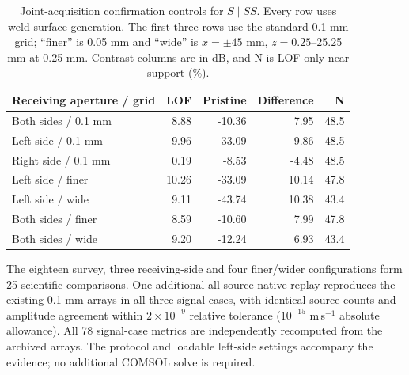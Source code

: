 \begin{table}[htbp]\centering\small
\caption{Joint-acquisition confirmation controls for $S\mid SS$. Every row uses weld-surface generation. The first three rows use the standard 0.1 mm grid; ``finer'' is 0.05 mm and ``wide'' is $x=\pm45$ mm, $z=0.25$--25.25 mm at 0.25 mm. Contrast columns are in dB, and N is LOF-only near support (\%).}
\label{saftapp:archive:partial:joint_controls}
\begin{tabularx}{\linewidth}{@{}Xrrrr@{}}\toprule
Receiving aperture / grid & LOF & Pristine & Difference & N\\\midrule
Both sides / 0.1 mm & 8.88 & -10.36 & 7.95 & 48.5 \\
Left side / 0.1 mm & 9.96 & -33.09 & 9.86 & 48.5 \\
Right side / 0.1 mm & 0.19 & -8.53 & -4.48 & 48.5 \\
Left side / finer & 10.26 & -33.09 & 10.14 & 47.8 \\
Left side / wide & 9.11 & -43.74 & 10.38 & 43.4 \\
Both sides / finer & 8.59 & -10.60 & 7.99 & 47.8 \\
Both sides / wide & 9.20 & -12.24 & 6.93 & 43.4 \\

\bottomrule\end{tabularx}
\end{table}

The eighteen survey, three receiving-side and four finer/wider configurations form 25 scientific comparisons. One additional all-source native replay reproduces the existing 0.1 mm arrays in all three signal cases, with identical source counts and amplitude agreement within $2\times10^{-9}$ relative tolerance ($10^{-15}$ m\,s$^{-1}$ absolute allowance). All 78 signal-case metrics are independently recomputed from the archived arrays. The protocol and loadable left-side settings accompany the evidence; no additional COMSOL solve is required.
\FloatBarrier


